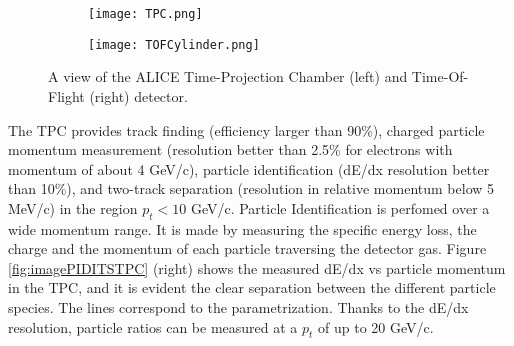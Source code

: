 \begin{figure}[!t]
\begin{subfigure}{0.5\textwidth}
\texttt{[image: TPC.png]}
\end{subfigure}
\begin{subfigure}{0.5\textwidth}
\texttt{[image: TOFCylinder.png]}
\end{subfigure}
\caption{A view of the ALICE Time-Projection Chamber (left) and Time-Of-Flight (right) detector.}
\label{fig:image3}
\end{figure}
The TPC provides track finding (efficiency larger than 90\%), charged particle momentum measurement (resolution better than 2.5\% for electrons with momentum of about 4 GeV/c), particle identification (dE/dx resolution better than 10\%), and two-track separation (resolution in relative momentum below 5 MeV/c) in the region $p_t<10$ GeV/c.
Particle Identification is perfomed over a wide momentum range. It is made by measuring the specific energy loss, the charge and the momentum of each particle traversing the detector gas. Figure \ref{fig:imagePIDITSTPC} (right) shows the measured dE/dx vs particle momentum in the TPC, and it is evident the clear separation between the different particle species. The lines correspond to the parametrization. Thanks to the dE/dx resolution, particle ratios can be measured at a $p_t$ of up to 20 GeV/c.

